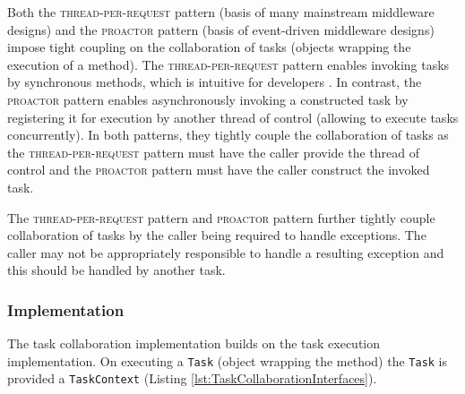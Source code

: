 \documentclass[prodmode]{style/acmlarge}
\begin{document}
Both the \textsc{thread-per-request} pattern \cite{thread-per-request} (basis of
many mainstream middleware designs) and the \textsc{proactor} pattern
\cite{proactor} (basis of event-driven middleware designs) impose tight
coupling on the collaboration of tasks (objects wrapping the execution of a
method).  The \textsc{thread-per-request} pattern enables invoking tasks by
synchronous methods, which is intuitive for developers \cite{proactor}.
In contrast, the \textsc{proactor} pattern enables asynchronously invoking a
constructed task by registering it for execution by another thread of control
(allowing to execute tasks concurrently).  In both patterns, they tightly couple
the collaboration of tasks as the \textsc{thread-per-request} pattern must have
the caller provide the thread of control and the \textsc{proactor} pattern must
have the caller construct the invoked task.

The \textsc{thread-per-request} pattern and \textsc{proactor} pattern further
tightly couple collaboration of tasks by the caller being required to handle
exceptions.  The caller may not be appropriately responsible to handle a
resulting exception and this should be handled by another task.


\subsubsection*{Implementation}

The task collaboration implementation builds on the task execution
implementation.  On executing a \texttt{Task} (object wrapping the method) the
\texttt{Task} is provided a \texttt{TaskContext} (Listing
\ref{lst:TaskCollaborationInterfaces}).
\end{document}
